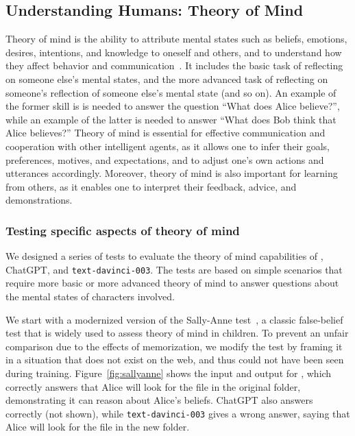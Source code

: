 \subsection{Understanding Humans: Theory of Mind}
\label{sec:mind}

Theory of mind is the ability to attribute mental states such as beliefs, emotions, desires, intentions, and knowledge to oneself and others, and to understand how they affect behavior and communication~\cite{wellman1992child}. It includes the basic task of reflecting on someone else's mental states, and the more advanced task of reflecting on someone's reflection of someone else's mental state (and so on). An example of the former skill is is needed to answer the question ``What does Alice believe?'', while an example of the latter is needed to answer ``What does Bob think that Alice believes?''
Theory of mind is essential for effective communication and cooperation with other intelligent agents, as it allows one to infer their goals, preferences, motives, and expectations, and to adjust one's own actions and utterances accordingly. Moreover, theory of mind is also important for learning from others, as it enables one to interpret their feedback, advice, and demonstrations.

\subsubsection{Testing specific aspects of theory of mind}
We designed a series of tests to evaluate the theory of mind capabilities of {\DV}, ChatGPT, and \texttt{text-davinci-003}. The tests are based on simple scenarios that require more basic or more advanced theory of mind to answer questions about the mental states of characters involved.

We start with a modernized version of the Sally-Anne test~\cite{baron1985does}, a classic false-belief test that is widely used to assess theory of mind in children.
To prevent an unfair comparison due to the effects of memorization, we modify the test by framing it in a situation that does not exist on the web, and thus could not have been seen during training.
Figure~\ref{fig:sallyanne} shows the input and output for {\DV}, which correctly answers that Alice will look for the file in the original folder, demonstrating it can reason about Alice's beliefs. ChatGPT also answers correctly (not shown), while \texttt{text-davinci-003} gives a wrong answer, saying that Alice will look for the file in the new folder.

